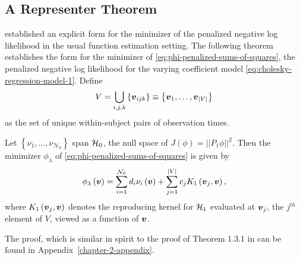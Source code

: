 

\subsection{A Representer Theorem}

\cite{wahba1990spline} established an explicit form for the minimizer of the penalized negative log likelihood in the usual function estimation setting. The following theorem establishes the form for the minimizer of \eqref{eq:phi-penalized-sums-of-squares}, the penalized negative log likelihood for the varying coefficient model \eqref{eq:cholesky-regression-model-1}. Define  
\[
V = \bigcup\limits_{i,j,k} \left\{\mbox{\boldmath $v$}_{ijk} \right\} \equiv \left\{ \mbox{\boldmath $v$}_1,\dots,\mbox{\boldmath $v$}_{\vert V \vert} \right\}
\]
\noindent
as the set of unique within-subject pairs of observation times. 

 \begin{theorem} \label{theorem:finite-dimensional-minimizer}
 Let $\left\{\nu_1,\dots, \nu_{\mathcal{N}_0}\right\}$ span $\mathcal{H}_0$, the null space of $J\left(\phi\right) = \vert \vert P_1 \phi\vert\vert^2$. Then the minimizer $\phi_\lambda$ of \eqref{eq:phi-penalized-sums-of-squares} is given by
 \begin{equation} \label{eq:form-of-the-minimizer-phi}
\phi_\lambda\left(\mbox{\boldmath $v$}\right) = \sum_{i = 1}^{\mathcal{N}_0} d_i \nu_{i}\left(\mbox{\boldmath $v$}\right) + \sum_{j = 1}^{\vert V \vert} c_j K_1\left(\mbox{\boldmath $v$}_j, \mbox{\boldmath $v$}\right),
\end{equation}
\noindent
where $K_1\left(\mbox{\boldmath $v$}_j, \mbox{\boldmath $v$} \right)$ denotes the reproducing kernel for $\mathcal{H}_1$ evaluated at ${\mbox{\boldmath $v$}_j}$, the $j^{th}$ element of $V$, viewed as a function of $\mbox{\boldmath $v$}$.
\end{theorem}
\vspace{0.5cm}
\noindent
The proof, which is similar in spirit to the proof of Theorem 1.3.1 in \cite{wahba1990spline} can be found in Appendix~\ref{chapter-2-appendix}.


